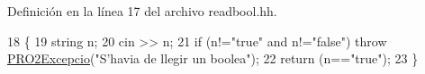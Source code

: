 Definición en la línea 17 del archivo readbool.\+hh.


\begin{DoxyCode}
18 \{
19   \textcolor{keywordtype}{string} n;
20   cin >> n;
21   \textcolor{keywordflow}{if} (n!=\textcolor{stringliteral}{"true"} and n!=\textcolor{stringliteral}{"false"}) \textcolor{keywordflow}{throw} \hyperlink{class_p_r_o2_excepcio}{PRO2Excepcio}(\textcolor{stringliteral}{"S'havia de llegir un boolea"});
22   \textcolor{keywordflow}{return} (n==\textcolor{stringliteral}{"true"});
23 \}
\end{DoxyCode}
